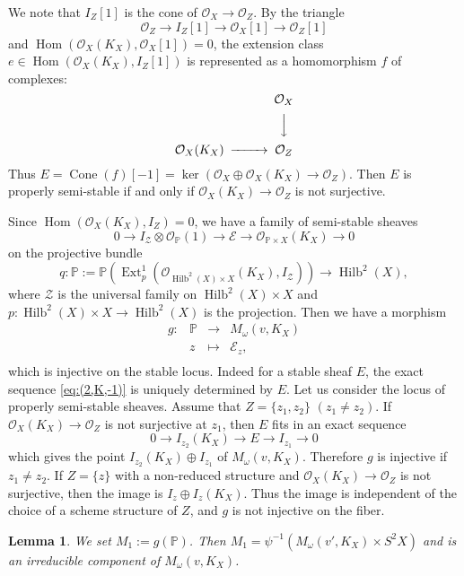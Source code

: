\documentclass[leqno,11pt]{amsart}
\def\P{\ensuremath{\mathbb{P}}}
\def\Ext{\mathop{\mathrm{Ext}}\nolimits}
\def\Hilb{\mathop{\mathrm{Hilb}}\nolimits}
\def\Hom{\mathop{\mathrm{Hom}}\nolimits}
\def\Cone{\mathop{\mathrm{Cone}}\nolimits}
\newtheorem{Lem}[Thm]{Lemma}
\theoremstyle{definition}
\def\P{\ensuremath{\mathbb{P}}}
\def\EE{\ensuremath{\mathcal E}}
\def\OO{\ensuremath{\mathcal O}}
\def\ZZ{\ensuremath{\mathcal Z}}
\begin{document}
We note that 
$I_Z[1]$ is the cone of $\OO_X \to \OO_Z$.
By the triangle
\begin{equation}
\OO_Z \to I_Z[1] \to \OO_X[1] \to \OO_Z[1] 
\end{equation}
and $\Hom(\OO_X(K_X),\OO_X[1])=0$,
the extension class $e \in \Hom(\OO_X(K_X),I_Z[1])$
is represented as a homomorphism $f$ of complexes: 
\begin{equation}\label{eq:cone(f)}
\begin{CD}
@. \OO_X\\
@. @VVV\\
\OO_X(K_X) @>>> \OO_Z
\end{CD}
\end{equation}
Thus $E=\Cone(f)[-1]=\ker(\OO_X \oplus \OO_X(K_X) \to \OO_Z)$.
Then $E$ is properly semi-stable if and only if
$\OO_X(K_X) \to \OO_Z$ is not surjective.

Since $\Hom(\OO_X(K_X),I_Z)=0$, we have a family
of semi-stable sheaves 
\begin{equation}
0 \to I_{\ZZ} \otimes \OO_{\P}(1) \to \EE \to \OO_{\P \times X}(K_X) \to 0
\end{equation}
on the projective bundle
$$
q:\P:=\P(\Ext^1_p(\OO_{\Hilb^2(X) \times X}(K_X),I_{\ZZ})) \to \Hilb^2(X),
$$
where $\ZZ$ is the universal family on $\Hilb^2(X) \times X$
and $p:\Hilb^2(X) \times X \to \Hilb^2(X)$ is the projection.
Then we have a morphism 
\begin{equation}
\begin{matrix}
g:& \P & \to & M_\omega(v,K_X)\\
& z & \mapsto & \EE_z, \\
\end{matrix}
\end{equation}
 which is injective
on the stable locus. 
Indeed for a stable sheaf $E$,  the exact sequence \eqref{eq:(2,K,-1)}
is uniquely determined by $E$.
Let us consider the locus of properly semi-stable sheaves.
Assume that $Z=\{z_1,z_2 \}$ $(z_1 \ne z_2)$.
If $\OO_X(K_X) \to \OO_Z$ is not surjective at $z_1$, then
$E$ fits in an exact sequence
$$
0 \to I_{z_2}(K_X) \to E \to I_{z_1} \to 0
$$ 
which gives the point $I_{z_2}(K_X) \oplus I_{z_1}$ of $M_\omega(v,K_X)$.
Therefore $g$ is injective if $z_1 \ne z_2$.
If $Z=\{z \}$ with a non-reduced structure
and $\OO_X(K_X) \to \OO_Z$ is not surjective, then
the image is $I_z \oplus I_z(K_X)$.
Thus the image is independent of the choice of a scheme structure of $Z$, and
$g$ is not injective on the fiber.
\begin{Lem}\label{lem:M_1}
We set $M_1:=g(\P)$.
Then $M_1=\psi^{-1}(M_\omega(v',K_X) \times S^2 X)$ and 
is an irreducible component of $M_\omega(v,K_X)$. 
\end{Lem}
\end{document}
